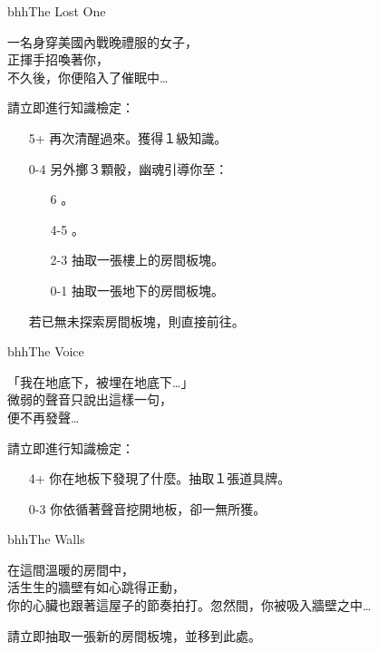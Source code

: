 \begin{EventCard}{bhh}{The Lost One}
  \begin{CardStory}
    一名身穿美國內戰晚禮服的女子，\\
    正揮手招喚著你，\\
    不久後，你便陷入了催眠中…
  \end{CardStory}
  \footnotesize
  請立即進行知識檢定：
  \begin{itemize}
    \item[5+] 再次清醒過來。獲得１級知識。
    \item[0-4] 另外擲３顆骰，幽魂引導你至：
      \begin{itemize}
        \item[6] 。
        \item[4-5] 。
        \item[2-3] 抽取一張樓上的房間板塊。
        \item[0-1] 抽取一張地下的房間板塊。
      \end{itemize}
      若已無未探索房間板塊，則直接前往。
  \end{itemize}
\end{EventCard}%
\linebreak[0]%
\begin{EventCard}{bhh}{The Voice}
  \begin{CardStory}
    「我在地底下，被埋在地底下…」\\
    微弱的聲音只說出這樣一句，\\
    便不再發聲…
  \end{CardStory}
  請立即進行知識檢定：
  \begin{itemize}
    \item[4+] 你在地板下發現了什麼。抽取１張道具牌。
    \item[0-3] 你依循著聲音挖開地板，卻一無所獲。
  \end{itemize}
\end{EventCard}%
\linebreak[0]%
\begin{EventCard}{bhh}{The Walls}
  \begin{CardStory}
    在這間溫暖的房間中，\\
    活生生的牆壁有如心跳得正動，\\
    你的心臟也跟著這屋子的節奏拍打。忽然間，你被吸入牆壁之中…
  \end{CardStory}
  請立即抽取一張新的房間板塊，並移到此處。\smallbreak
\end{EventCard}%
